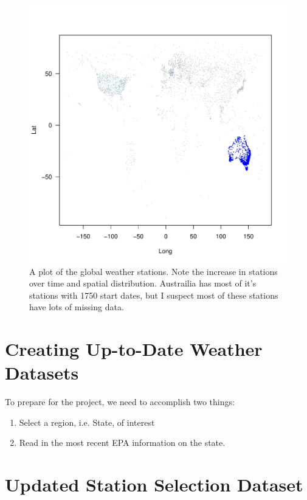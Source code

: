 \documentclass{article}\usepackage[]{graphicx}\usepackage[]{xcolor}
\makeatletter
\def\maxwidth{ %
  \ifdim\Gin@nat@width>\linewidth
    \linewidth
  \else
    \Gin@nat@width
  \fi
}
\newenvironment{knitrout}{}{} %
\makeatother
\begin{document}
\begin{figure}
  \caption{A plot of the global weather stations. Note the increase in stations over time and spatial distribution. Austrailia has most of it's stations with 1750 start dates, but I suspect most of these stations have lots of missing data. }
  \label{fig:global-weather-stations}
\begin{knitrout}
\color{fgcolor}
\includegraphics[width=\maxwidth]{figure/unnamed-chunk-3-1} 
\end{knitrout}
\end{figure}

\section{Creating Up-to-Date Weather Datasets}

To prepare for the project, we need to accomplish two things: 

\begin{enumerate}
  \item Select a region, i.e. State, of interest
  \item Read in the most recent EPA information on the state.
\end{enumerate}

\section{Updated Station Selection Dataset}
\end{document}
